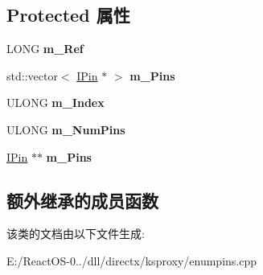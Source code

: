 \subsection*{Protected 属性}
\begin{DoxyCompactItemize}
\item 
\mbox{\label{class_c_enum_pins_a993097e7a1528c5695a3b1caa96a3aeb}} 
L\+O\+NG {\bfseries m\+\_\+\+Ref}
\item 
\mbox{\label{class_c_enum_pins_aea087929162cb095dc67d199f04cb732}} 
std\+::vector$<$ \hyperlink{interface_i_pin}{I\+Pin} $\ast$ $>$ {\bfseries m\+\_\+\+Pins}
\item 
\mbox{\label{class_c_enum_pins_ac44224bb5f1c572e05286e477fab1b73}} 
U\+L\+O\+NG {\bfseries m\+\_\+\+Index}
\item 
\mbox{\label{class_c_enum_pins_a37c476cdb2c87665c22ded584cf2001a}} 
U\+L\+O\+NG {\bfseries m\+\_\+\+Num\+Pins}
\item 
\mbox{\label{class_c_enum_pins_a60316c45094eb5506ba7f159cf41fb1f}} 
\hyperlink{interface_i_pin}{I\+Pin} $\ast$$\ast$ {\bfseries m\+\_\+\+Pins}
\end{DoxyCompactItemize}
\subsection*{额外继承的成员函数}


该类的文档由以下文件生成\+:\begin{DoxyCompactItemize}
\item 
E\+:/\+React\+O\+S-\/0../dll/directx/ksproxy/enumpins.\+cpp\end{DoxyCompactItemize}
